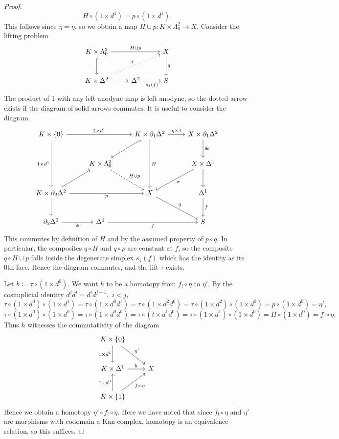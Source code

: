 \begin{proof}
	\[
		H\circ (1\times d^1) = p \circ (1\times d^1)
	.\]
	This follows since $\eta =\eta $,  so we obtain a map $H\cup p : K\times \Lambda _0^2 \to X$. Consider the lifting problem
	\[\begin{tikzcd}[row sep = 2.5em, column sep = 2.5em]
		K\times \Lambda_0^2 \ar[" H\cup p ", rr] \ar[hook, d]  && X \ar[" q ", d]  \\
		K\times \Delta ^2 \ar[r] \ar[" \tau  ", dotted, urr]  &\Delta ^2 \ar[" s_1(f) "', r] & S
	\end{tikzcd}\]
	The product of 1 with any left anodyne map is left anodyne, so the dotted arrow exists if the diagram of solid arrows commutes. It is useful to consider the diagram
	\[\begin{tikzcd}[row sep = 2.5em, column sep = 2.5em]
		K\times \left\{ 0 \right\} \ar[" 1\times d^1 ", rr] \ar[" 1\times d^1 "', dd] & & K\times \partial _1\Delta ^2\ar[" H ", dd] \ar[hook, dl] \ar[" \eta \times 1 ", r] & X\times \partial_1\Delta ^2 \ar[" \cong  ", d]  \\
											      & K\times \Lambda _0^2 \ar[" H\cup p ", dashed, dr]  && X\times \Delta ^1 \ar[" \sigma  ", dl]\ar[d]  \\
		K\times \partial _2\Delta ^2\ar[" p "', rr]\ar[hook, ur] \ar[d]  && X \ar[" q ", dr]  & \Delta ^1 \ar[" f ", d]   \\
						    \partial _2\Delta ^2 \ar[" \cong  "', r]  & \Delta ^1 \ar[" f "', rr]  && S
	\end{tikzcd}\]
	This commutes by definition of $H$ and by the assumed property of $p\circ q$. In particular, the composites $q\circ H$ and $q\circ p$ are constant at $f$, so the composite $q\circ H\cup p$ falls inside the degenerate simplex $s_1(f)$ which has the identity as its 0th face. Hence the diagram commutes, and the lift $\tau $ exists.

	Let $h\coloneqq \tau \circ (1\times d^0)$. We want $h$ to be a homotopy from $f_!\circ \eta $ to $\eta '$. By the cosimplicial identity $d^jd^i = d^id^{j-1} ,$ $i<j$,
	\[
		\tau \circ (1\times d^0)\circ (1\times d^1) = \tau \circ (1\times d^0d^1) = \tau \circ (1\times d^2d^0)=\tau \circ (1\times d^2)\circ (1\times d^0)=p\circ (1\times d^0)=\eta '	
	,\]
	\[
		\tau \circ (1\times d^0)\circ (1\times d^0) = \tau \circ (1\times d^0d^0) = \tau \circ (t\times d^1d^0) = \tau \circ (1\times d^1)\circ (1\times d^0) = H\circ (1\times d^0)=f_! \circ \eta 
	.\]
	Thus $h$ witnesses the commutativity of the diagram
	\[\begin{tikzcd}[row sep = 2.5em, column sep = 2.5em]
	K\times \left\{ 0 \right\} \ar[" 1\times d^1 "', d] \ar[" \eta ' ", dr]  &  \\
	K\times \Delta ^1 \ar[" h ", r]  & X \\
	K\times \left\{ 1 \right\} \ar[" 1\times d^0 ", u] \ar[" f_!\circ \eta  "', ur]  & 
	\end{tikzcd}\]
	Hence we obtain a homotopy $\eta '\circ f_!\circ \eta$. Here we have noted that since $f_! \circ \eta $ and $\eta '$  are morphisms with codomain a Kan complex, homotopy is an equivalence relation, so this suffices.


\end{proof}
